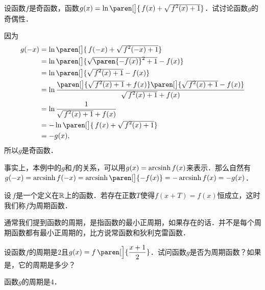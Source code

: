 \begin{example*}
  设函数\(f\)是奇函数，函数\(g(x) = \ln\paren[\big]{\,f(x) + \sqrt{\,\smash{f^2(x)+1}\rule[-.3ex]{0ex}{1.8ex}}}\)．试讨论函数\(g\)的奇偶性．

  \begin{remark}
    因为
    \[
      \begin{split}
        g(-x)
        &= \ln\paren[\big]{\,f(-x) + \sqrt{\,\smash{f^2(-x)+1}\rule[-.3ex]{0ex}{1.8ex}}} \\
        &= \ln\paren[\big]{\sqrt{\smash{\paren{-f(x)}^2+1}\rule[-.3ex]{0ex}{1.8ex}} - f(x)} \\
        &= \ln\paren[\big]{\sqrt{\,\smash{f^2(x)+1}\rule[-.3ex]{0ex}{1.8ex}} - f(x)} \\
        &= \ln{\frac{
          \paren[\big]{\sqrt{\,\smash{f^2(x)+1}\rule[-.3ex]{0ex}{1.8ex}} + f(x)}
          \paren[\big]{\sqrt{\,\smash{f^2(x)+1}\rule[-.3ex]{0ex}{1.8ex}} - f(x)}
          }{
          \sqrt{\,\smash{f^2(x)+1}\rule[-.3ex]{0ex}{1.8ex}} + f(x)}
          } \\
        &= \ln \frac1{\sqrt{\,\smash{f^2(x)+1}\rule[-.3ex]{0ex}{1.8ex}} + f(x)} \\
        &= -\ln\paren[\big]{\,f(x) + \sqrt{\,\smash{f^2(x)+1}\rule[-.3ex]{0ex}{1.8ex}}} \\
        &= -g(x),
      \end{split}
    \]
    所以\(g\)是奇函数．

    事实上，本例中的\(g\)和\(f\)的关系，可以用\(g(x) = \operatorname{arcsinh} f(x)\)来表示．那么自然有\(g(-x) = \arcsinh f(-x) = \arcsinh\paren[\big]{-f(x)} = - \arcsinh f(x) = -g(x)\)．
  \end{remark}
\end{example*}

\begin{definition*}
  设\(\,f\)是一个定义在\(\mathbb{R}\)上的函数．若存在正数\(T\)使得\(f(x+T) = f(x)\)恒成立，这时我们称\(f\)为周期函数．

  \begin{remark}
    通常我们提到函数的周期，是指函数的最小正周期，如果存在的话．并不是每个周期函数都有最小正周期的，比方说常函数和狄利克雷函数．
  \end{remark}
\end{definition*}

\begin{example*}
  设函数\(f\)的周期是\(2\)且\(g(x) = f\,\paren[\Big]{\dfrac{x+1}{2}}\)．试问函数\(g\)是否为周期函数？如果是，它的周期是多少？

  \begin{remark}
    函数\(g\)的周期是\(4\)．
  \end{remark}
\end{example*}


